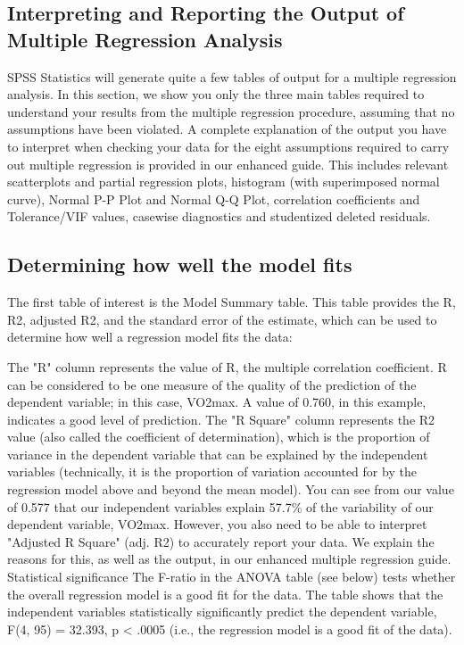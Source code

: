 \documentclass[]{article}
\begin{document}
		\subsection{Interpreting and Reporting the Output of Multiple Regression Analysis}
		SPSS Statistics will generate quite a few tables of output for a multiple regression analysis. In this section, we show you only the three main tables required to understand your results from the multiple regression procedure, assuming that no assumptions have been violated. A complete explanation of the output you have to interpret when checking your data for the eight assumptions required to carry out multiple regression is provided in our enhanced guide. This includes relevant scatterplots and partial regression plots, histogram (with superimposed normal curve), Normal P-P Plot and Normal Q-Q Plot, correlation coefficients and Tolerance/VIF values, casewise diagnostics and studentized deleted residuals.
		
		\subsection{Determining how well the model fits}
		The first table of interest is the Model Summary table. This table provides the R, R2, adjusted R2, and the standard error of the estimate, which can be used to determine how well a regression model fits the data:
		
		
		The "R" column represents the value of R, the multiple correlation coefficient. R can be considered to be one measure of the quality of the prediction of the dependent variable; in this case, VO2max. A value of 0.760, in this example, indicates a good level of prediction. The "R Square" column represents the R2 value (also called the coefficient of determination), which is the proportion of variance in the dependent variable that can be explained by the independent variables (technically, it is the proportion of variation accounted for by the regression model above and beyond the mean model). You can see from our value of 0.577 that our independent variables explain 57.7\% of the variability of our dependent variable, VO2max. However, you also need to be able to interpret "Adjusted R Square" (adj. R2) to accurately report your data. We explain the reasons for this, as well as the output, in our enhanced multiple regression guide.
		Statistical significance
		The F-ratio in the ANOVA table (see below) tests whether the overall regression model is a good fit for the data. The table shows that the independent variables statistically significantly predict the dependent variable, F(4, 95) = 32.393, p < .0005 (i.e., the regression model is a good fit of the data).
		
\end{document}
